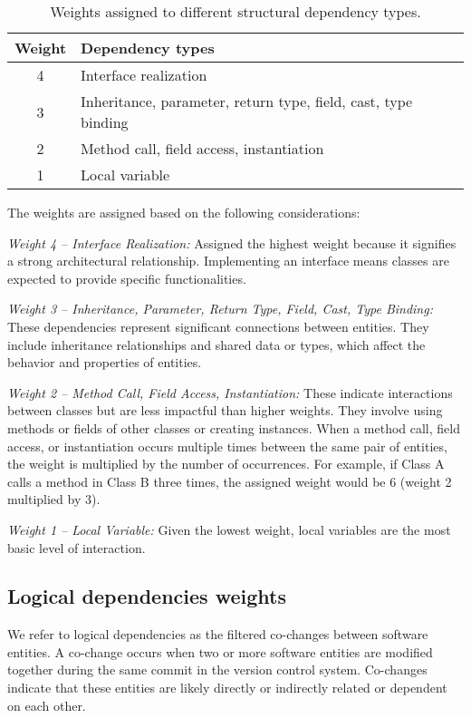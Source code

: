 \begin{table}[htbp]
\centering
\begin{tabular}{|c|l|}
\hline
\textbf{Weight} & \textbf{Dependency types} \\
\hline
4 & Interface realization \\
3 & Inheritance, parameter, return type, field, cast, type binding \\
2 & Method call, field access, instantiation \\
1 & Local variable \\
\hline
\end{tabular}
\caption{Weights assigned to different structural dependency types. \cite{Finding-key-classes}}
\label{tab:structural_weights}
\end{table}

The weights are assigned based on the following considerations:

\textit{Weight 4 – Interface Realization:} Assigned the highest weight because it signifies a strong architectural relationship. Implementing an interface means classes are expected to provide specific functionalities.

\textit{Weight 3 – Inheritance, Parameter, Return Type, Field, Cast, Type Binding:} These dependencies represent significant connections between entities. They include inheritance relationships and shared data or types, which affect the behavior and properties of entities.

\textit{Weight 2 – Method Call, Field Access, Instantiation:} These indicate interactions between classes but are less impactful than higher weights. They involve using methods or fields of other classes or creating instances. When a method call, field access, or instantiation occurs multiple times between the same pair of entities, the weight is multiplied by the number of occurrences. For example, if Class A calls a method in Class B three times, the assigned weight would be 6 (weight 2 multiplied by 3).

\textit{Weight 1 – Local Variable:} Given the lowest weight, local variables are the most basic level of interaction.






\subsection{Logical dependencies weights}
\label{subsec:logical_weights}


We refer to logical dependencies as the filtered co-changes between software entities. A co-change occurs when two or more software entities are modified together during the same commit in the version control system. Co-changes indicate that these entities are likely directly or indirectly related or dependent on each other.

